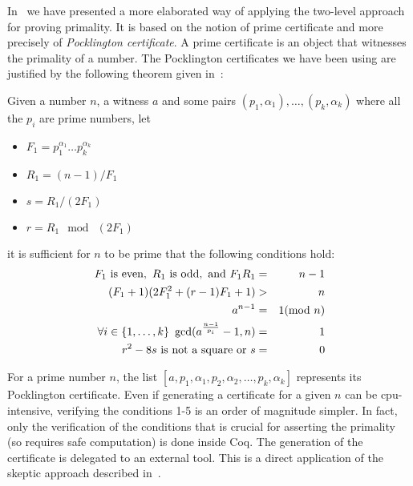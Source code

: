 In~\cite{GreTheWer} we have presented a more elaborated way of applying 
the two-level approach for proving primality. It is based on the
notion of prime certificate and more precisely of {\it Pocklington certificate}.
A prime certificate is an object that witnesses the primality of a number.
The Pocklington certificates we have been using are justified by the following
theorem given in~\cite{lehmer}:
\begin{theorem}\label{lehmer}
Given a number $n$, a witness $a$ and some pairs $(p_1,\alpha_1),\dots,(p_k,\alpha_k)$
 where all the $p_i$ are prime numbers,
 let
 \begin{itemize}
\item[]$F_1 = p_1^{\alpha_1}\dots p_k^{\alpha_k}$
\item[]$R_1 = (n - 1) / F_1$
\item[]$ s = R_1 / (2F_1)$
\item[] $r = R_1 \mod\ (2F_1)$
 \end{itemize}
 it is sufficient for $n$ to be prime that the following conditions hold:
\begin{eqnarray}
F_1 \,\,\hbox{is even},\,\,
R_1 \,\, \hbox{is odd}, \,\,\hbox{and}\,\,
F_1R_1  &=&  n -1\\
(F_1 + 1) (2F_1^2 + (r - 1) F_1 + 1) & >& n\\
a^{n-1} &=& 1 (\mod\ n)\\
\forall i\in\{1,\dots,k\}~\gcd(a^{\frac{n-1}{p_i}}-1,n)&=&1\\
r^2 - 8 s\,\,\mbox{is not a square}\,\,\hbox{or}\,\,s &=& 0
\end{eqnarray}
\end{theorem}
For a prime number $n$, the list $[a, p_1, \alpha_1, p_2, \alpha_2, \dots, p_k, \alpha_k]$
represents its Pocklington certificate.
Even if generating a certificate for a given $n$ can be cpu-intensive, verifying
the conditions 1-5 is an order of magnitude simpler. In fact, only
the verification of the conditions that is crucial for asserting the primality (so requires
safe computation) is done inside {\sc Coq}.
The generation of the certificate is delegated to an external tool.
This is a direct application of the skeptic approach described in~\cite{BarBar,HarThe}.
                 
